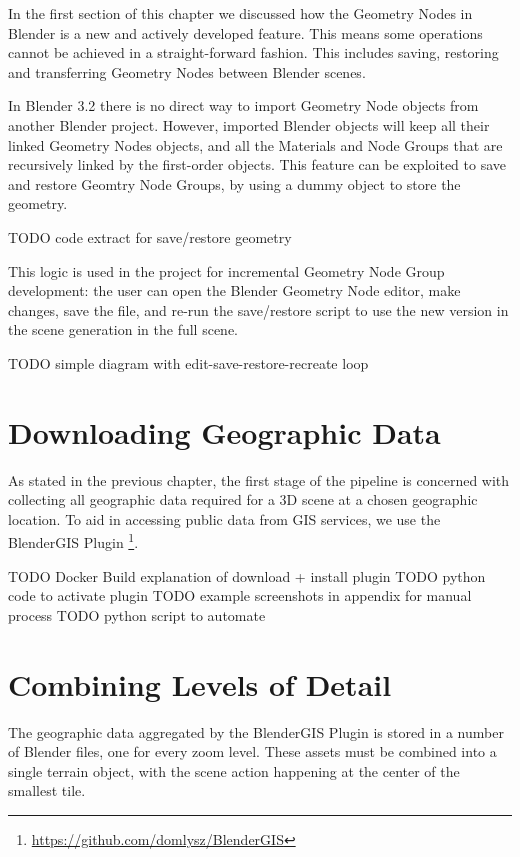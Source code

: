 In the first section of this chapter we discussed how the Geometry Nodes in Blender is a new and actively developed feature. This means some operations cannot be achieved in a straight-forward fashion. This includes saving, restoring and transferring Geometry Nodes between Blender scenes.

In Blender 3.2 there is no direct way to import Geometry Node objects from another Blender project. However, imported Blender objects will keep all their linked Geometry Nodes objects, and all the Materials and Node Groups that are recursively linked by the first-order objects. This feature can be exploited to save and restore Geomtry Node Groups, by using a dummy object to store the geometry.

TODO code extract for save/restore geometry

This logic is used in the project for incremental Geometry Node Group development: the user can open the Blender Geometry Node editor, make changes, save the file, and re-run the save/restore script to use the new version in the scene generation in the full scene.

TODO simple diagram with edit-save-restore-recreate loop


\section{Downloading Geographic Data}
\label{sec:dowonload-geo-data}

As stated in the previous chapter, the first stage of the pipeline is concerned with collecting all geographic data required for a 3D scene at a chosen geographic location. To aid in accessing public data from GIS services, we use the BlenderGIS Plugin \footnote{\url{https://github.com/domlysz/BlenderGIS}}.

TODO Docker Build explanation of download + install plugin
TODO python code to activate plugin
TODO example screenshots in appendix for manual process
TODO python script to automate


\section{Combining Levels of Detail}
\label{sec:combine-levels-of-detail}

The geographic data aggregated by the BlenderGIS Plugin is stored in a number of Blender files, one for every zoom level. These assets must be combined into a single terrain object, with the scene action happening at the center of the smallest tile.

